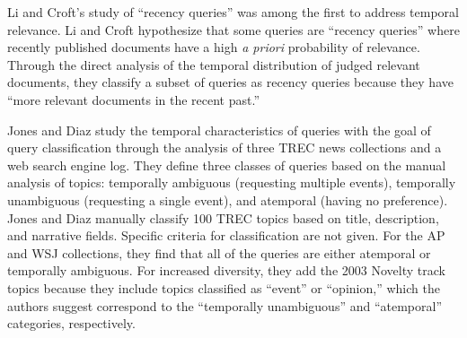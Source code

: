 \documentclass{sig-alternate}
\begin{document}
\begin{table}
\small
{}
\caption{TREC topics and Collections Used in Prior Temporal Retrieval Studies.}
\label{table.topics}
\end{table}

Li and Croft's study of ``recency queries''  \cite{Li2003} was among the first to address temporal relevance. Li and Croft hypothesize that some queries are ``recency queries'' where recently published documents have a high \textit{a priori} probability of relevance.  Through the direct analysis of the temporal distribution of judged relevant documents, they classify a subset of queries as recency queries because they have ``more relevant documents in the recent past.''

Jones and Diaz \cite{Jones2007} study the temporal characteristics of queries with the goal of query classification through the analysis of three TREC news collections and a web search engine log. They define three classes of queries based on the manual analysis of topics: temporally ambiguous (requesting multiple events),  temporally unambiguous (requesting a single event), and atemporal (having no preference). Jones and Diaz manually classify 100 TREC topics based on title, description, and narrative fields. Specific criteria for classification are not given. For the AP and WSJ collections, they find that all of the queries are either atemporal or temporally ambiguous. For increased diversity, they add the 2003 Novelty track topics because they include topics classified as ``event'' or ``opinion,'' which the authors suggest correspond to the ``temporally unambiguous'' and ``atemporal'' categories, respectively.
\end{document}
